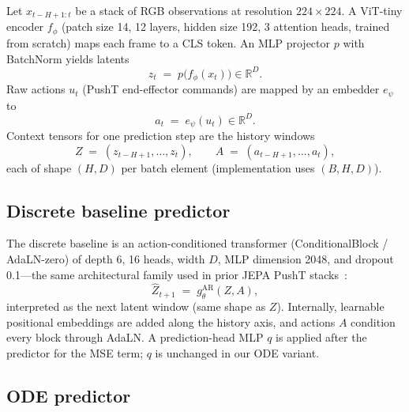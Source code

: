 Let $x_{t-H+1:t}$ be a stack of RGB observations at resolution
$224{\times}224$.
A ViT-tiny encoder $f_\phi$ (patch size 14, 12 layers, hidden size 192,
3 attention heads, trained from scratch) maps each frame to a CLS
token.
An MLP projector $p$ with BatchNorm yields latents
\begin{equation}
  z_t \;=\; p\bigl(f_\phi(x_t)\bigr) \in \mathbb{R}^{D}.
  \label{eq:encode}
\end{equation}
Raw actions $u_t$ (PushT end-effector commands) are mapped by an
embedder $e_\psi$ to
\begin{equation}
  a_t \;=\; e_\psi(u_t)\in\mathbb{R}^{D}.
  \label{eq:action}
\end{equation}
Context tensors for one prediction step are the history windows
\begin{equation}
  Z \;=\; (z_{t-H+1},\ldots,z_t),\qquad
  A \;=\; (a_{t-H+1},\ldots,a_t),
\end{equation}
each of shape $(H, D)$ per batch element (implementation uses
$(B,H,D)$).

\subsection{Discrete baseline predictor}
\label{sec:ar}

The discrete baseline is an action-conditioned transformer
(ConditionalBlock / AdaLN-zero) of depth 6, 16 heads, width $D$, MLP
dimension 2048, and dropout 0.1---the same architectural family used in
prior JEPA PushT stacks~\cite{maes2026lewm}:
\begin{equation}
  \hat Z_{t+1}
  \;=\;
  g^{\mathrm{AR}}_\theta(Z, A),
  \label{eq:ar}
\end{equation}
interpreted as the next latent window (same shape as $Z$).
Internally, learnable positional embeddings are added along the
history axis, and actions $A$ condition every block through AdaLN.
A prediction-head MLP $q$ is applied after the predictor for the MSE
term; $q$ is unchanged in our ODE variant.

\subsection{ODE predictor}
\label{sec:ode}

